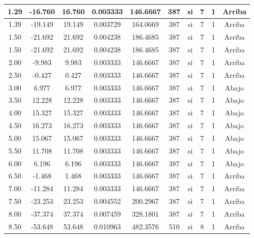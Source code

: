 \begin{table}[H]
{\begin{tabular}{|c|c|c|c|c|c|c|c|c|c|}
    \hline
    1.29 & -16.760 & 16.760 & 0.003333 & 146.6667 & 387 & si  & 7   & 1   & Arriba \bigstrut\\
    \hline
    1.39 & -19.149 & 19.149 & 0.003729 & 164.0669 & 387 & si  & 7   & 1   & Arriba \bigstrut\\
    \hline
    1.50 & -21.692 & 21.692 & 0.004238 & 186.4685 & 387 & si  & 7   & 1   & Arriba \bigstrut\\
    \hline
    1.50 & -21.692 & 21.692 & 0.004238 & 186.4685 & 387 & si  & 7   & 1   & Arriba \bigstrut\\
    \hline
    2.00 & -9.983 & 9.983 & 0.003333 & 146.6667 & 387 & si  & 7   & 1   & Arriba \bigstrut\\
    \hline
    2.50 & -0.427 & 0.427 & 0.003333 & 146.6667 & 387 & si  & 7   & 1   & Arriba \bigstrut\\
    \hline
    3.00 & 6.977 & 6.977 & 0.003333 & 146.6667 & 387 & si  & 7   & 1   & Abajo \bigstrut\\
    \hline
    3.50 & 12.228 & 12.228 & 0.003333 & 146.6667 & 387 & si  & 7   & 1   & Abajo \bigstrut\\
    \hline
    4.00 & 15.327 & 15.327 & 0.003333 & 146.6667 & 387 & si  & 7   & 1   & Abajo \bigstrut\\
    \hline
    4.50 & 16.273 & 16.273 & 0.003333 & 146.6667 & 387 & si  & 7   & 1   & Abajo \bigstrut\\
    \hline
    5.00 & 15.067 & 15.067 & 0.003333 & 146.6667 & 387 & si  & 7   & 1   & Abajo \bigstrut\\
    \hline
    5.50 & 11.708 & 11.708 & 0.003333 & 146.6667 & 387 & si  & 7   & 1   & Abajo \bigstrut\\
    \hline
    6.00 & 6.196 & 6.196 & 0.003333 & 146.6667 & 387 & si  & 7   & 1   & Abajo \bigstrut\\
    \hline
    6.50 & -1.468 & 1.468 & 0.003333 & 146.6667 & 387 & si  & 7   & 1   & Arriba \bigstrut\\
    \hline
    7.00 & -11.284 & 11.284 & 0.003333 & 146.6667 & 387 & si  & 7   & 1   & Arriba \bigstrut\\
    \hline
    7.50 & -23.253 & 23.253 & 0.004552 & 200.2967 & 387 & si  & 7   & 1   & Arriba \bigstrut\\
    \hline
    8.00 & -37.374 & 37.374 & 0.007459 & 328.1801 & 387 & si  & 7   & 1   & Arriba \bigstrut\\
    \hline
    8.50 & -53.648 & 53.648 & 0.010963 & 482.3576 & 510 & si  & 8   & 1   & Arriba \bigstrut\\

\end{tabular}}
\end{table}
